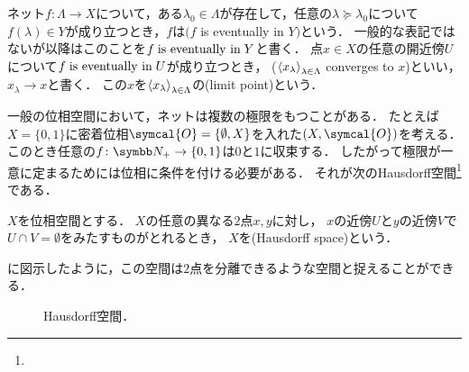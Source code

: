\documentclass{ltjsbook}
\begin{document}
\begin{thmbox}
\begin{definition}
ネット\(f\colon \Lambda \to X\)について，ある\(\lambda_0 \in \Lambda\)が存在して，任意の\(\lambda \succeq \lambda_0\)について\(f(\lambda) \in Y\)が成り立つとき，\(f\)は\((f\) is eventually in \(Y)\)という．
一般的な表記ではないが以降はこのことを\(f \mathrel{\text{is eventually in}} Y\)と書く．
点\(x \in X\)の任意の開近傍\(U\)について\(f \mathrel{\text{is eventually in}} U\)が成り立つとき，
(\({\langle {x}_\lambda \rangle}_{\lambda \in \Lambda}\) converges to \(x\))といい，\(x_\lambda \to x\)と書く．
この\(x\)を\({\langle {x}_\lambda \rangle}_{\lambda \in \Lambda}\)の(limit point)という．
\end{definition}
\end{thmbox}

一般の位相空間において，ネットは複数の極限をもつことがある．
たとえば\(X = \{0, 1\}\)に密着位相\(\symcal{O} = \{\emptyset, X\}\)を入れた\(\tuple{X, \symcal{O}}\)を考える．
このとき任意の\(f\colon \PositiveInteger \to \{0, 1\}\)は\(0\)と\(1\)に収束する．
したがって極限が一意に定まるためには位相に条件を付ける必要がある．
それが次のHausdorff空間\footnote{}である．

\begin{thmbox}
\begin{definition}
\(X\)を位相空間とする．
\(X\)の任意の異なる\(2\)点\(x, y\)に対し，
\(x\)の近傍\(U\)と\(y\)の近傍\(V\)で\(U \cap V = \emptyset\)をみたすものがとれるとき，
\(X\)を(Hausdorff space)という．
\end{definition}
\end{thmbox}

に図示したように，この空間は\(2\)点を分離できるような空間と捉えることができる．

\begin{figure}
    \centering
    \caption{Hausdorff空間．}
\end{figure}
\end{document}
